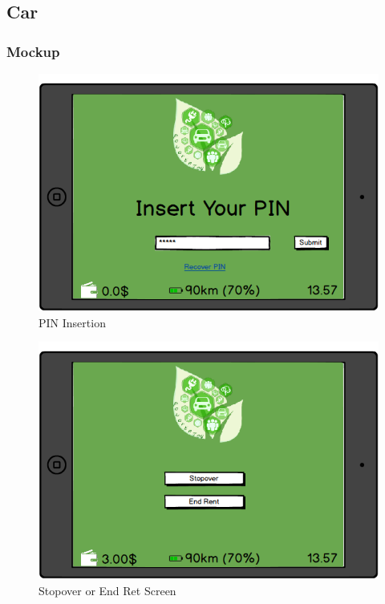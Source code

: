 \documentclass[english]{article}
\begin{document}
		\begin{landscape}
			\subsection{Car}
				\subsubsection{Mockup}
					\begin{figure}[H]
						\centering
						\includegraphics[scale=0.6]{./Mockups/Car/insertPIN.png}%
						\caption{PIN Insertion}
					\end{figure}
					\begin{figure}[H]
						\centering
						\includegraphics[scale=0.6]{./Mockups/Car/Stopover-endrent.png}%
						\caption{Stopover or End Ret Screen}

\end{figure}
\end{landscape}
\end{document}
